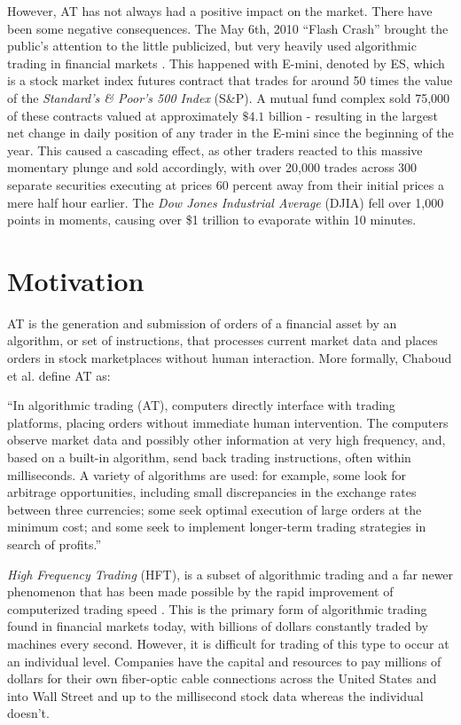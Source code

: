 \documentclass[../thesis.tex]{subfiles}
\begin{document}
However, AT has not always had a positive impact on the market. There have been some negative consequences. The May 6th, 2010 ``Flash Crash'' brought the public's attention to the little publicized, but very heavily used algorithmic trading in financial markets \cite{Kirilenko2017}. This happened with E-mini, denoted by ES, which is a stock market index futures contract that trades for around 50 times the value of the \textit{Standard's \& Poor's 500 Index} (S\&P). A mutual fund complex sold 75,000 of these contracts valued at approximately $\$4.1$ billion - resulting in the largest net change in daily position of any trader in the E-mini since the beginning of the year. This caused a cascading effect, as other traders reacted to this massive momentary plunge and sold accordingly, with over 20,000 trades across 300 separate securities executing at prices 60 percent away from their initial prices a mere half hour earlier. The \textit{Dow Jones Industrial Average} (DJIA) fell over 1,000 points in moments, causing over \$1 trillion to evaporate within 10 minutes. 


\section{Motivation}

AT is the generation and submission of orders of a financial asset by an algorithm, or set of instructions, that processes current market data and places orders in stock marketplaces without human interaction. More formally, Chaboud et al. \cite{Chaboud2009} define AT as: \begin{displayquote} ``In algorithmic trading (AT), computers directly interface with trading platforms, placing orders without immediate human intervention. The computers observe market data and possibly other information at very high frequency, and, based on a built-in algorithm, send back trading instructions, often within milliseconds. A variety of algorithms are used: for example, some look for arbitrage opportunities,
including small discrepancies in the exchange rates between three currencies; some
seek optimal execution of large orders at the minimum cost; and some seek to
implement longer-term trading strategies in search of profits.'' \end{displayquote}

\textit{High Frequency Trading} (HFT), is a subset of algorithmic trading and a far newer phenomenon that has been made possible by the rapid improvement of computerized trading speed \cite{Gomber2011}. This is the primary form of algorithmic trading found in financial markets today, with billions of dollars constantly traded by machines every second. However, it is difficult for trading of this type to occur at an individual level. Companies have the capital and resources to pay millions of dollars for their own fiber-optic cable connections across the United States and into Wall Street and up to the millisecond stock data whereas the individual doesn't. 
\end{document}
